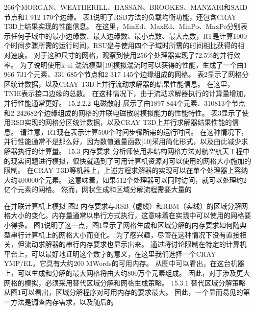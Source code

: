 \documentclass[UTF8,11pt,a4paper,openany,fontset=fandol]{ctexbook}
\begin{document}
266个MORGAN、WEATHERILL、HASSAN、BROOKES、MANZARI和SAID节点和1 912 170个边缘。 表1说明了RSB方法的负载均衡功能，还包含CRAY T3D上结果实现的性能信息。 在这里，MinEd、MaxEd、MinPo、MaxPo分别表示任何子域中的最小边缘数、最大边缘数、最小点数、最大点数，RT是计算1000个时间步骤所需的运行时间，RSU是与使用四个子域时所需的时间相比获得的相对速度。 对于这种尺寸的网格，观察到使用256个处理器实现了72.5\%的并行效率。 为了说明使用k-ui 湍流模型[19]模拟湍流时可以获得的性能，生成了一个由1 966 731个元素、331 685个节点和2 317 145个边缘组成的网格。 表2显示了网格分区统计数据，以及CRAY T3D上并行流动求解器的结果性能信息。 在这里，TNIE表示接口边缘的总数。 在这种情况下，由于流动求解器执行的计算量增加，并行性能通常更好。 15.2.2.2 电磁散射 展示了由1897 844个元素、310813个节点和2 242682个边缘组成的网格的并联电磁散射模拟能力的性能特性。 表3显示了使用RSB实现的网格分区统计数据，以及CRAY T3D上并行求解器结果性能的信息。 请注意，RT现在表示计算500个时间步骤所需的运行时间。 在这种情况下，并行性能通常不是那么好，因为数值通量函数[10]采用简化形式，以及由此减少求解器执行的计算量。 15.3 内存要求 分析师使用非结构网格方法对航空航天工程中的现实问题进行模拟，很快就遇到了可用计算机资源对可以使用的网格大小施加的限制。 在CRAY T3D等机器上，上述方程求解器的实现可以在单个处理器上容纳大约400000个元素。 这意味着，如果512个处理器可以同时访问，就可以处理约2亿个元素的网格。 然而，网状生成和区域分解流程需要大量的

在并联计算机上模拟 图2 内存要求与RSB（虚线）和RBM（实线）的区域分解网格大小的变化。内存量通常以串行方式执行，这意味着在实践中可以使用的网格要小得多。 图1说明了这一点，图1显示了网格生成和区域分解的内存要求如何随典型串行计算机上的网格大小而变化。 为了感兴趣，尽管在这种情况下没有直接相关，但流动求解器的串行内存要求也显示出来。 通过将讨论限制在特定的计算机平台上，可以最好地证明这个数字的意义，在这里我们选择一个CRAY YMP/EL，它具有大约200 MWords的可用内存。 从图中可以看出，在这台机器上，可以生成和分解的最大网格将由大约800万个元素组成。 因此，对于涉及更大网格的模拟，必须采用替代区域分解和网格生成策略。 15.3.1 替代区域分解策略 从图1可以看出，区域分解程序对可用内存的要求最大。 因此，一个显而易见的第一方法是调查内存需求，以及随后的
\end{document}
